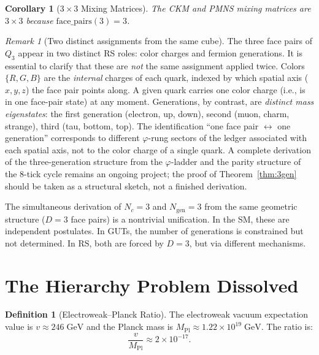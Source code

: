\documentclass[12pt,a4paper]{article}
\newtheorem{corollary}[theorem]{Corollary}
\theoremstyle{definition}
\newtheorem{definition}[theorem]{Definition}
\theoremstyle{remark}
\newtheorem{remark}[theorem]{Remark}
\begin{document}
\begin{corollary}[$3 \times 3$ Mixing Matrices]
The CKM and PMNS mixing matrices are $3 \times 3$ because
$\mathrm{face\_pairs}(3) = 3$.
\end{corollary}

\begin{remark}[Two distinct assignments from the same cube]
\label{rem:two-uses}
The three face pairs of $Q_3$ appear in two distinct RS roles: color
charges and fermion generations.  It is essential to clarify that
these are \emph{not} the same assignment applied twice.  Colors
$\{R,G,B\}$ are the \emph{internal} charges of each quark, indexed
by which spatial axis ($x, y, z$) the face pair points along.  A
given quark carries one color charge (i.e., is in one face-pair
state) at any moment.  Generations, by contrast, are \emph{distinct
mass eigenstates}: the first generation (electron, up, down),
second (muon, charm, strange), third (tau, bottom, top).  The
identification ``one face pair $\leftrightarrow$ one generation''
corresponds to different $\varphi$-rung sectors of the ledger associated
with each spatial axis, not to the color charge of a single quark.
A complete derivation of the three-generation structure from the
$\varphi$-ladder and the parity structure of the 8-tick cycle
remains an ongoing project; the proof of Theorem~\ref{thm:3gen}
should be taken as a structural sketch, not a finished derivation.

The simultaneous derivation of $N_c = 3$ and $N_{\mathrm{gen}} = 3$
from the same geometric structure ($D = 3$ face pairs) is a
nontrivial unification.  In the SM, these are independent postulates.
In GUTs, the number of generations is constrained but not determined.
In RS, both are forced by $D = 3$, but via different mechanisms.
\end{remark}

\section{The Hierarchy Problem Dissolved}
\label{sec:hierarchy}

\begin{definition}[Electroweak--Planck Ratio]
The electroweak vacuum expectation value is $v \approx 246\;\mathrm{GeV}$
and the Planck mass is $M_{\mathrm{Pl}} \approx 1.22 \times 10^{19}\;\mathrm{GeV}$.
The ratio is:
\begin{equation}
  \frac{v}{M_{\mathrm{Pl}}} \approx 2 \times 10^{-17}.
\end{equation}
\end{definition}
\end{document}
